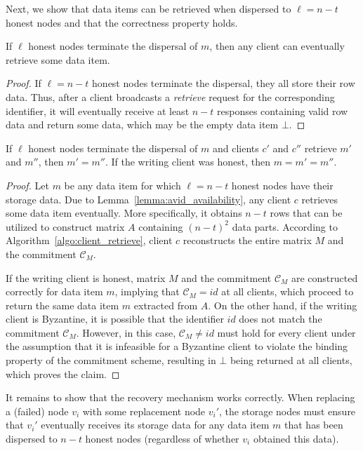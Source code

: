 \documentclass[sigconf,screen]{acmart}
\begin{document}
Next, we show that data items can be retrieved when dispersed to $\ell = n-t$ honest nodes and that the correctness property holds.

\begin{lemma}[Availability]\label{lemma:avid_availability}
If $\ell$ honest nodes terminate the dispersal of $m$, then any client can eventually retrieve some data item.
\end{lemma}
\begin{proof}
If $\ell = n-t$ honest nodes terminate the dispersal, they all store their row data. Thus, after a client broadcasts a \emph{retrieve} request for the corresponding identifier, it will eventually receive at least $n-t$ responses containing valid row data and return some data, which may be the empty data item $\bot$.
\end{proof}

\begin{lemma}[Correctness]\label{lemma:avid_correctness}
If $\ell$ honest nodes terminate the dispersal of $m$ and clients $c'$ and $c''$ retrieve $m'$ and $m''$, then $m' = m''$. If the writing client was honest, then $m = m' = m''$.
\end{lemma}
\begin{proof}

Let $m$ be any data item for which $\ell = n-t$ honest nodes have their storage data. Due to Lemma~\ref{lemma:avid_availability}, any client $c$ retrieves some data item eventually. More specifically, it obtains $n-t$ rows that can be utilized to construct matrix $A$ containing $(n-t)^2$ data parts.
According to Algorithm~\ref{algo:client_retrieve}, client $c$ reconstructs the entire matrix $M$ and the commitment $\mathcal{C}_M$.

If the writing client is honest, matrix $M$ and the commitment $\mathcal{C}_M$ are constructed correctly for data item $m$, implying that $\mathcal{C}_M = id$ at all clients, which proceed to return the same data item $m$ extracted from $A$.
On the other hand, if the writing client is Byzantine, it is possible that the identifier $id$ does not match the commitment $\mathcal{C}_M$. However, in this case, $\mathcal{C}_M \ne id$ must hold for every client under the assumption that it is infeasible for a Byzantine client to violate the binding property of the commitment scheme, resulting in $\bot$ being returned at all clients, which proves the claim.
\end{proof}

It remains to show that the recovery mechanism works correctly. When replacing a (failed) node $v_i$ with some replacement node $v_i'$, the storage nodes must ensure that $v_i'$ eventually receives its storage data for any data item $m$ that has been dispersed to $n-t$ honest nodes (regardless of whether $v_i$ obtained this data).
\end{document}
